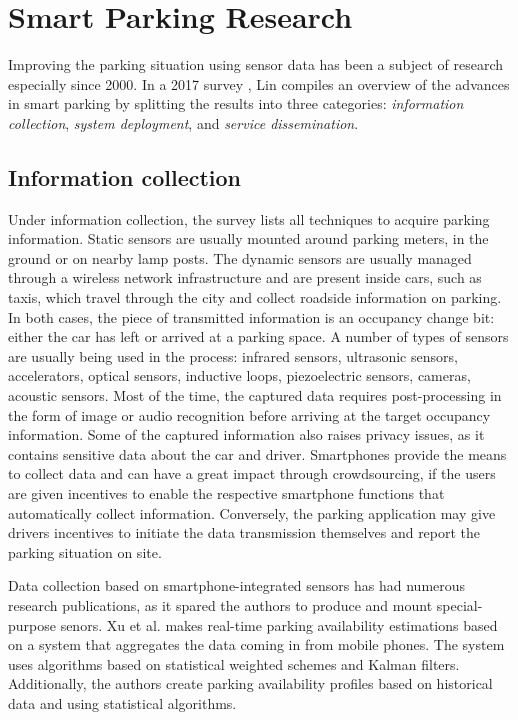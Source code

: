 	\section{Smart Parking Research}
	Improving the parking situation using sensor data has been a subject of research especially since 2000. In a 2017 survey , Lin compiles an overview of the advances in smart parking by splitting the results into three categories: \textit{information collection}, \textit{system deployment}, and \textit{service dissemination}.
	
	\subsection{Information collection}
	Under information collection, the survey lists all techniques to acquire parking information. Static sensors are usually mounted around parking meters, in the ground or on nearby lamp posts. The dynamic sensors are usually managed through a wireless network infrastructure and are present inside cars, such as taxis, which travel through the city and collect roadside information on parking. In both cases, the piece of transmitted information is an occupancy change bit: either the car has left or arrived at a parking space. A number of types of sensors are usually being used in the process: infrared sensors, ultrasonic sensors, accelerators, optical sensors, inductive loops, piezoelectric sensors, cameras, acoustic sensors. Most of the time, the captured data requires post-processing in the form of image or audio recognition before arriving at the target occupancy information. Some of the captured information also raises privacy issues, as it contains sensitive data about the car and driver. Smartphones provide the means to collect data and can have a great impact through crowdsourcing, if the users are given incentives to enable the respective smartphone functions that automatically collect information. Conversely, the parking application may give drivers incentives to initiate the data transmission themselves and report the parking situation on site. 
	
	Data collection based on smartphone-integrated sensors has had numerous research publications, as it spared the authors to produce and mount special-purpose senors. Xu et al.  makes real-time parking availability estimations based on a system that aggregates the data coming in from mobile phones. The system uses algorithms based on statistical weighted schemes and Kalman filters. Additionally, the authors create parking availability profiles based on historical data and using statistical algorithms. 
	
